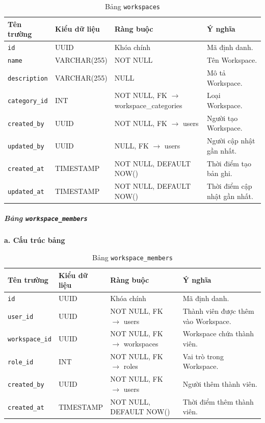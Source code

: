 \begin{table}[H]
\centering
\begin{tabular}{|p{3cm}|p{3.5cm}|p{3.5cm}|p{4cm}|}
\hline
\textbf{Tên trường} & \textbf{Kiểu dữ liệu} & \textbf{Ràng buộc} & \textbf{Ý nghĩa} \\
\hline
\texttt{id} & UUID & Khóa chính & Mã định danh. \\
\hline
\texttt{name} & VARCHAR(255) & NOT NULL & Tên Workspace. \\
\hline
\texttt{description} & VARCHAR(255) & NULL & Mô tả Workspace. \\
\hline
\texttt{category\_id} & INT & NOT NULL, FK $\rightarrow$ workspace\_categories & Loại Workspace. \\
\hline
\texttt{created\_by} & UUID & NOT NULL, FK $\rightarrow$ users & Người tạo Workspace. \\
\hline
\texttt{updated\_by} & UUID & NULL, FK $\rightarrow$ users & Người cập nhật gần nhất. \\
\hline
\texttt{created\_at} & TIMESTAMP & NOT NULL, DEFAULT NOW() & Thời điểm tạo bản ghi. \\
\hline
\texttt{updated\_at} & TIMESTAMP & NOT NULL, DEFAULT NOW() & Thời điểm cập nhật gần nhất. \\
\hline
\end{tabular}
\caption{Bảng \texttt{workspaces}}
\label{tab:db_workspaces}
\end{table}


\subparagraph{Bảng \texttt{workspace\_members}} \mbox{}

\hspace{1.5em}\textbf{a. Cấu trúc bảng}

\begin{table}[H]
\centering
\begin{tabular}{|p{3cm}|p{3.5cm}|p{3.5cm}|p{4cm}|}
\hline
\textbf{Tên trường} & \textbf{Kiểu dữ liệu} & \textbf{Ràng buộc} & \textbf{Ý nghĩa} \\
\hline
\texttt{id} & UUID & Khóa chính & Mã định danh. \\
\hline
\texttt{user\_id} & UUID & NOT NULL, FK $\rightarrow$ users & Thành viên được thêm vào Workspace. \\
\hline
\texttt{workspace\_id} & UUID & NOT NULL, FK $\rightarrow$ workspaces & Workspace chứa thành viên. \\
\hline
\texttt{role\_id} & INT & NOT NULL, FK $\rightarrow$ roles & Vai trò trong Workspace. \\
\hline
\texttt{created\_by} & UUID & NOT NULL, FK $\rightarrow$ users & Người thêm thành viên. \\
\hline
\texttt{created\_at} & TIMESTAMP & NOT NULL, DEFAULT NOW() & Thời điểm thêm thành viên. \\
\hline
\end{tabular}
\caption{Bảng \texttt{workspace\_members}}
\label{tab:db_workspace_members}
\end{table}

